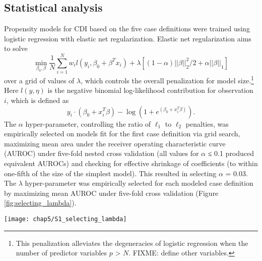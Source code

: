 \subsection{Statistical analysis}

Propensity models for CDI based on the five case definitions were trained using logistic regression with elastic net regularization. Elastic net regularization aims to solve $$\min_{\beta_0,\beta} \frac{1}{N} \sum_{i=1}^{N} w_i l(y_i,\beta_0+\beta^T x_i) + \lambda\left[(1-\alpha)||\beta||_2^2/2 + \alpha ||\beta||_1\right]$$ over a grid of values of $\lambda$, which controls the overall penalization for model size.\footnote{This penalization alleviates the degeneracies of logistic regression when the number of predictor variables $p$ > $N$. FIXME: define other variables.} Here $l(y,\eta)$ is the negative binomial log-likelihood contribution for observation $i$, which is defined as $$y_i \cdot (\beta_0 + x_i^T \beta) - \log (1+e^{(\beta_0+x_i^T \beta)}).$$ The $\alpha$ hyper-parameter, controlling the ratio of $\ell_1$ to $\ell_2$ penalties, was empirically selected on models fit for the first case definition via grid search, maximizing mean area under the receiver operating characteristic curve (AUROC) under five-fold nested cross validation (all values for $\alpha$ ≤ 0.1 produced equivalent AUROCs) and checking for effective shrinkage of coefficients (to within one-fifth of the size of the simplest model). This resulted in selecting $\alpha$ = 0.03. The $\lambda$ hyper-parameter was empirically selected for each modeled case definition by maximizing mean AUROC under five-fold cross validation (Figure \ref{fig:selecting_lambda}).
\begin{figure*}[tbp]
  \texttt{[image: chap5/S1\_selecting\_lambda]}
\end{figure*}
